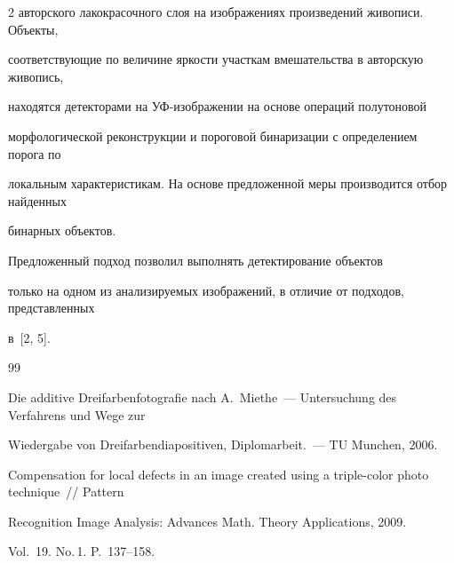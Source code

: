 \begin{multicols}{2}
авторского лакокрасочного слоя на изображениях произведений живописи. Объекты, 


соответствующие по величине яркости участкам вмешательства в авторскую живопись, 


находятся детекторами на УФ-изоб\-ра\-же\-нии на основе операций полутоновой 


морфологической реконструкции и пороговой бинаризации с определением порога по 


локальным характеристикам. На основе предложенной меры производится отбор найденных 


бинарных объектов. 





Предложенный подход позволил выполнять детектирование объектов 


только на одном из анализируемых изображений, в отличие от подходов, представленных 


в~[2, 5].





{\small\frenchspacing


{%




\begin{thebibliography}{99}









Die additive Dreifarbenfotografie nach A.~Miethe~--- Untersuchung des Verfahrens und Wege zur 


Wiedergabe von Dreifarbendiapositiven, Diplomarbeit.~--- TU M$\ddot{\mbox{u}}$nchen, 2006.









Compensation for local defects in an image created using a triple-color photo technique~// Pattern 


Recognition Image Analysis: Advances Math. Theory Applications, 2009. 


Vol.~19. No.\,1. P.~137--158.








\end{thebibliography}}}
\end{multicols}
